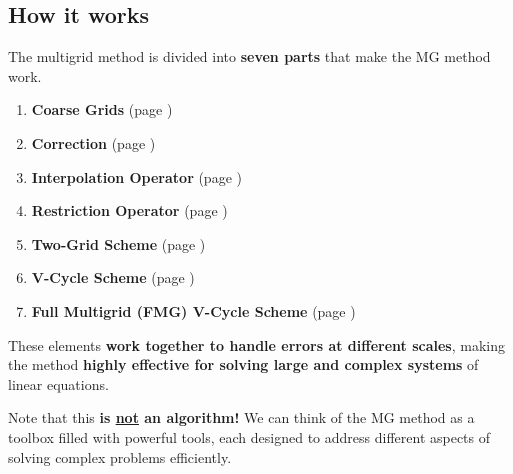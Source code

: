 \subsection{How it works}

The multigrid method is divided into \textbf{seven parts} that make the MG method work.
\begin{enumerate}
    \item \textbf{Coarse Grids} (page \pageref{subsubsection: Coarse Grids})
    \item \textbf{Correction} (page \pageref{subsubsection: Correction})
    \item \textbf{Interpolation Operator} (page \pageref{subsubsection: Interpolation Operator})
    \item \textbf{Restriction Operator} (page \pageref{subsubsection: Restriction Operator})
    \item \textbf{Two-Grid Scheme} (page \pageref{subsubsection: Two-Grid Scheme})
    \item \textbf{V-Cycle Scheme} (page \pageref{subsubsection: V-Cycle Scheme})
    \item \textbf{Full Multigrid (FMG) V-Cycle Scheme} (page \pageref{subsubsection: Full Multigrid (FMG) V-Cycle Scheme})
\end{enumerate}

\noindent
These elements \textbf{work together to handle errors at different scales}, making the method \textbf{highly effective for solving large and complex systems} of linear equations.

\highspace
Note that this \textbf{is \underline{not} an algorithm!} We can think of the MG method as a toolbox filled with powerful tools, each designed to address different aspects of solving complex problems efficiently.

